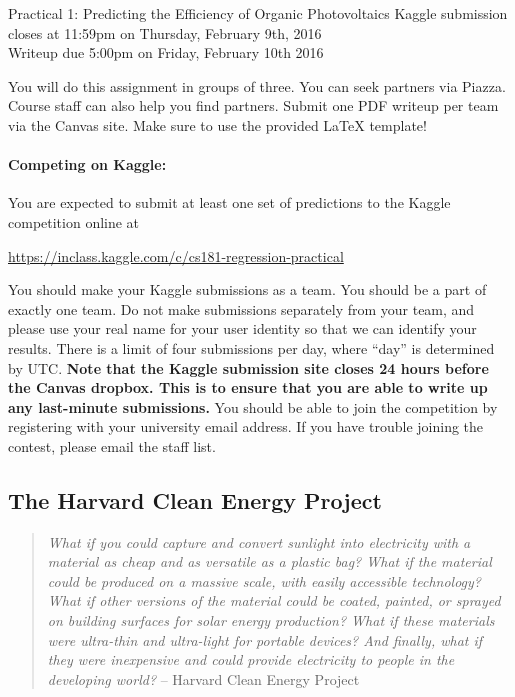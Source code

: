 \documentclass[12pt]{article}
\begin{document}
	\begin{center}
		{\Large Practical 1: Predicting the Efficiency of Organic Photovoltaics}
		Kaggle submission closes at 11:59pm on Thursday, February 9th, 2016\\
		Writeup due 5:00pm on Friday,  February 10th 2016 
	\end{center}
	
	\noindent You will do this assignment in groups of three. You can seek partners via Piazza.  Course staff can also help you find partners.  
Submit one PDF writeup per team via the Canvas site. Make sure to use the provided \LaTeX \hspace{1pt} template!
	
	\paragraph{Competing on Kaggle:} You are expected to submit at least one set of predictions to the Kaggle competition online at
	\begin{center}
		\url{https://inclass.kaggle.com/c/cs181-regression-practical}
	\end{center}
	You should make your Kaggle submissions as a team.  You should be a part of exactly one team. Do not make submissions separately from your team, and please use your real name for your user identity so that we can identify your results.  There is a limit of four submissions per day, where ``day'' is determined by UTC.  \textbf{Note that the Kaggle submission site closes 24 hours before the Canvas dropbox.  This is to ensure that you are able to write up any last-minute submissions.}  You should be able to join the competition by registering with your university email address.  If you have trouble joining the contest, please email the staff list.
	
	\subsection*{The Harvard Clean Energy Project}
	
	\begin{quote}
		\emph{What if you could capture and convert sunlight into electricity with a material as cheap and as versatile as a plastic bag? What if the material could be produced on a massive scale, with easily accessible technology? What if other versions of the material could be coated, painted, or sprayed on building surfaces for solar energy production? What if these materials were ultra-thin and ultra-light for portable devices? And finally, what if they were inexpensive and could provide electricity to people in the developing world?} -- Harvard Clean Energy Project
	\end{quote}
	
\end{document}
